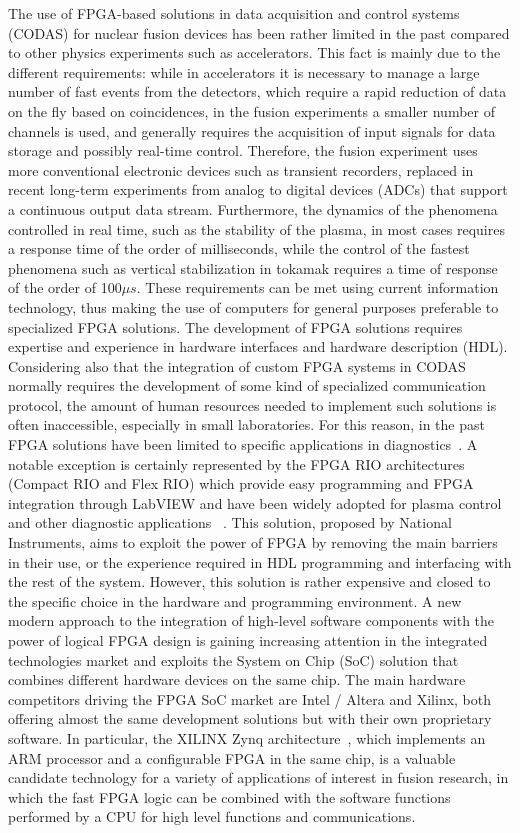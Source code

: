 The use of FPGA-based solutions in data acquisition and control systems (CODAS) for nuclear fusion devices has been rather limited in the past compared to other physics experiments such as accelerators. This fact is mainly due to the different requirements: while in accelerators it is necessary to manage a large number of fast events from the detectors, which require a rapid reduction of data on the fly based on coincidences, in the fusion experiments a smaller number of channels is used, and generally requires the acquisition of input signals for data storage and possibly real-time control. 
Therefore, the fusion experiment uses more conventional electronic devices such as transient recorders, replaced in recent long-term experiments from analog to digital devices (ADCs) that support a continuous output data stream. Furthermore, the dynamics of the phenomena controlled in real time, such as the stability of the plasma, in most cases requires a response time of the order of milliseconds, while the control of the fastest phenomena such as vertical stabilization in tokamak requires a time of response of the order of 100$\mu s$. These requirements can be met using current information technology, thus making the use of computers for general purposes preferable to specialized FPGA solutions. The development of FPGA solutions requires expertise and experience in hardware interfaces and hardware description (HDL). Considering also that the integration of custom FPGA systems in CODAS normally requires the development of some kind of specialized communication protocol, the amount of human resources needed to implement such solutions is often inaccessible, especially in small laboratories. For this reason, in the past FPGA solutions have been limited to specific applications in diagnostics~\cite{ana_1,ana_2}. A notable exception is certainly represented by the FPGA RIO architectures~\cite{ana_3} (Compact RIO and Flex RIO) which provide easy programming and FPGA integration through LabVIEW and have been widely adopted for plasma control~\cite{ana_4} and other diagnostic applications~\cite{ana_5} . This solution, proposed by National Instruments, aims to exploit the power of FPGA by removing the main barriers in their use, or the experience required in HDL programming and interfacing with the rest of the system. However, this solution is rather expensive and closed to the specific choice in the hardware and programming environment. A new modern approach to the integration of high-level software components with the power of logical FPGA design is gaining increasing attention in the integrated technologies market and exploits the System on Chip (SoC) solution that combines different hardware devices on the same chip. The main hardware competitors driving the FPGA SoC market are Intel / Altera and Xilinx, both offering almost the same development solutions but with their own proprietary software. In particular, the XILINX Zynq architecture~\cite{ana_6}, which implements an ARM processor and a configurable FPGA in the same chip, is a valuable candidate technology for a variety of applications of interest in fusion research, in which the fast FPGA logic can be combined with the software functions performed by a CPU for high level functions and communications.

